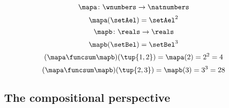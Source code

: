 \begin{forslides}
    \begin{equation}
        \label{eq:slides_session2_177}
        \mapa\colon \wnumbers \to \natnumbers
    \end{equation}
    \begin{equation}
        \label{eq:slides_session2_178}
        \mapa(\setAel)=\setAel^2
    \end{equation}
    \begin{equation}
        \label{eq:slides_session2_179}
        \mapb\colon \reals \to \reals
    \end{equation}
    \begin{equation}
        \label{eq:slides_session2_180}
        \mapb(\setBel)=\setBel^3
    \end{equation}
    \begin{equation}
        \label{eq:slides_session2_181}
        (\mapa \funcsum \mapb)(\tup{1,2})=\mapa(2)=2^2=4
    \end{equation}
    \begin{equation}
        \label{eq:slides_session2_182}
        (\mapa \funcsum \mapb)(\tup{2,3})=\mapb(3)=3^3 = 28
    \end{equation}

    \subsection{The compositional perspective}


\end{forslides}

